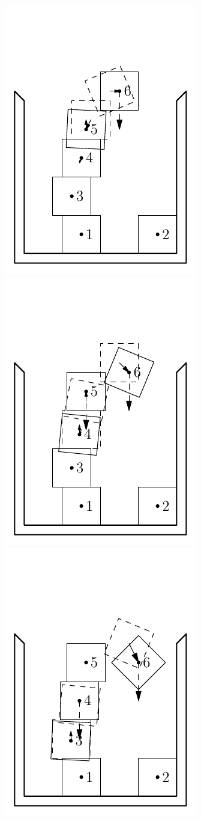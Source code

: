 \documentclass[12pt, sumlimits, intlimits]{article}
\begin{document}
\begin{figure}
\includegraphics[width=\w]{dem-4}%
\includegraphics[width=\w]{dem-5}%
\includegraphics[width=\w]{dem-6}%

\end{figure}
\end{document}
